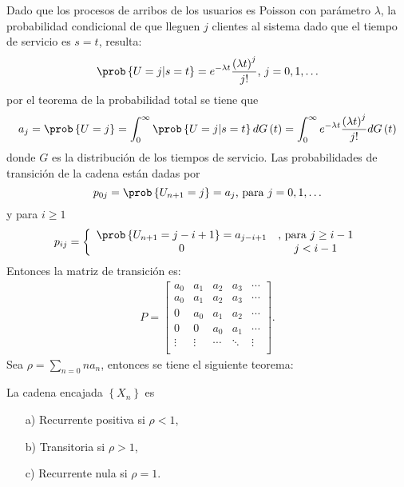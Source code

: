 Dado que los procesos de arribos de los usuarios es Poisson con par\'ametro $\lambda$, la probabilidad condicional de que lleguen $j$ clientes al sistema dado que el tiempo de servicio es $s=t$, resulta:
\begin{eqnarray*}
\prob\left\{U=j|s=t\right\}=e^{-\lambda t}\frac{\left(\lambda
t\right)^{j}}{j!}\textrm{,   }j=0,1,\ldots
\end{eqnarray*}
por el teorema de la probabilidad total se tiene que
\begin{equation}
a_{j}=\prob\left\{U=j\right\}=\int_{0}^{\infty}\prob\left\{U=j|s=t\right\}dG\left(t\right)=\int_{0}^{\infty}e^{-\lambda
t}\frac{\left(\lambda t\right)^{j}}{j!}dG\left(t\right)
\end{equation}
donde $G$ es la distribuci\'on de los tiempos de servicio. Las probabilidades de transici\'on de la cadena est\'an dadas por
\begin{equation}
p_{0j}=\prob\left\{U_{n+1}=j\right\}=a_{j}\textrm{, para
}j=0,1,\ldots
\end{equation}
y para $i\geq1$
\begin{equation}
p_{ij}=\left\{\begin{array}{cc}
\prob\left\{U_{n+1}=j-i+1\right\}=a_{j-i+1}&\textrm{, para }j\geq i-1\\
0 & j<i-1\\
\end{array}
\right.
\end{equation}
Entonces la matriz de transici\'on es:
\begin{eqnarray*}
P=\left[\begin{array}{ccccc}
a_{0} & a_{1} & a_{2} & a_{3} & \cdots\\
a_{0} & a_{1} & a_{2} & a_{3} & \cdots\\
0 & a_{0} & a_{1} & a_{2} & \cdots\\
0 & 0 & a_{0} & a_{1} & \cdots\\
\vdots & \vdots & \cdots & \ddots &\vdots\\
\end{array}
\right].
\end{eqnarray*}
Sea $\rho=\sum_{n=0}na_{n}$, entonces se tiene el siguiente teorema:
\begin{Teo}
La cadena encajada $\left\{X_{n}\right\}$ es
\begin{itemize}
\item[a)] Recurrente positiva si $\rho<1$,
\item[b)] Transitoria
si $\rho>1$, 
\item[c)] Recurrente nula si $\rho=1$.
\end{itemize}
\end{Teo}

